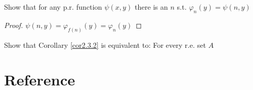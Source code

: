\documentclass[11pt]{article}
\begin{document}
\begin{exercise}
\label{ex2.3.9}
Show that for any p.r. function \(\psi(x,y)\) there is an \(n\) s.t. \(\varphi_n(y)=\psi(n,y)\)
\end{exercise}

\begin{proof}
\(\psi(n,y)=\varphi_{f(n)}(y)=\varphi_n(y)\)
\end{proof}

\begin{exercise}
\label{ex2.3.10}
Show that Corollary \ref{cor2.3.2} is equivalent to: For every r.e. set \(A\)
\end{exercise}
\section{Reference}
\label{sec:org28fabc1}


\end{document}
